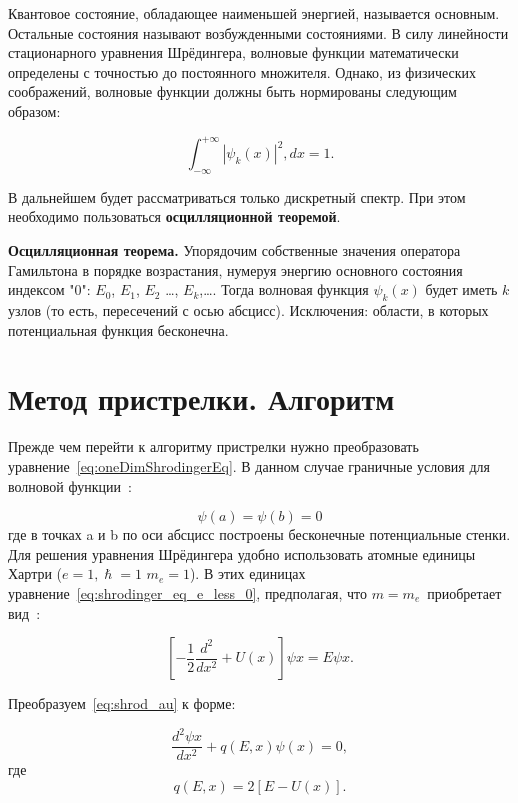 \documentclass[a4paper,12pt]{article}
\begin{document}
Квантовое состояние, обладающее наименьшей энергией, называется основным.
Остальные состояния называют возбужденными состояниями.
В силу линейности стационарного уравнения Шрёдингера, волновые функции математически определены с точностью до постоянного множителя.
Однако, из физических соображений, волновые функции должны быть нормированы следующим образом:

\begin{equation}
    \int_{-\infty}^{+\infty} |\psi_k(x)|^2, dx = 1.
    \label{eq:wave_func_normalization}
\end{equation}

В дальнейшем будет рассматриваться только дискретный спектр.
При этом необходимо пользоваться \textbf{осцилляционной теоремой}.

\textbf{Осцилляционная теорема.}
Упорядочим собственные значения оператора Гамильтона в порядке возрастания, нумеруя энергию основного состояния индексом "0": $E_0$, $E_1$, $E_2$ \dots, $E_k$,\dots.
Тогда волновая функция $\psi_k(x)$ будет иметь $k$ узлов (то есть, пересечений с осью абсцисс).
Исключения: области, в которых потенциальная функция бесконечна.

\section{Метод пристрелки. Алгоритм}\label{sec:shooting_method}

Прежде чем перейти к алгоритму пристрелки нужно преобразовать уравнение~\eqref{eq:oneDimShrodingerEq}.
В данном случае граничные условия для волновой функции~\cite{tim}:

\begin{equation}
    \psi(a) =\psi(b) = 0
    \label{eq:waveFuncBordCond}
\end{equation}
где в точках a и b по оси абсцисс построены бесконечные потенциальные стенки.
Для решения уравнения Шрёдингера удобно использовать атомные единицы Хартри (\(e = 1, \hslash = 1\)  $m_e = 1$).
В этих единицах уравнение~\eqref{eq:shrodinger_eq_e_less_0}, предполагая, что $m=m_e$~приобретает вид~\cite{tim}:

\begin{equation}
    \left[ -\frac{1}{2}\frac{d^2}{dx^2} +U(x) \right]\psi{x}=E\psi{x}.
    \label{eq:shrod_au}
\end{equation}

Преобразуем~\eqref{eq:shrod_au} к форме:

\begin{equation}
    \frac{d^2\psi{x}}{dx^2} + q(E, x)\psi(x)=0,
    \label{eq:shrod_au_converted_form}
\end{equation}
где
\begin{equation}
    q(E, x)=2\left[ E - U(x) \right].
    \label{eq:q_e_x}
\end{equation}
\end{document}
